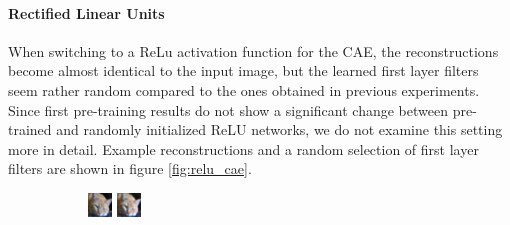 \documentclass{article}
\begin{document}
    \paragraph{Rectified Linear Units}

      When switching to a ReLu activation function \citep{nair2010rectified} for the CAE, the reconstructions become almost identical to the input image, but the learned first layer filters seem rather random compared to the ones obtained in previous experiments. Since first pre-training results do not show a significant change between pre-trained and randomly initialized ReLU networks, we do not examine this setting more in detail. Example reconstructions and a random selection of first layer filters are shown in figure \ref{fig:relu_cae}.

      \begin{figure}[b]

      \centering

				\begin{subfigure}{0.4\linewidth}

					\centering
					\includegraphics[width=0.4\linewidth]{../graphics/reconstructions/cifar/relu/input_00_relu.png}
					\includegraphics[width=0.4\linewidth]{../graphics/reconstructions/cifar/relu/reconstruction_00_relu.png}

				\end{subfigure}
				\begin{subfigure}{0.4\linewidth}


\end{subfigure}
\end{figure}
\end{document}

